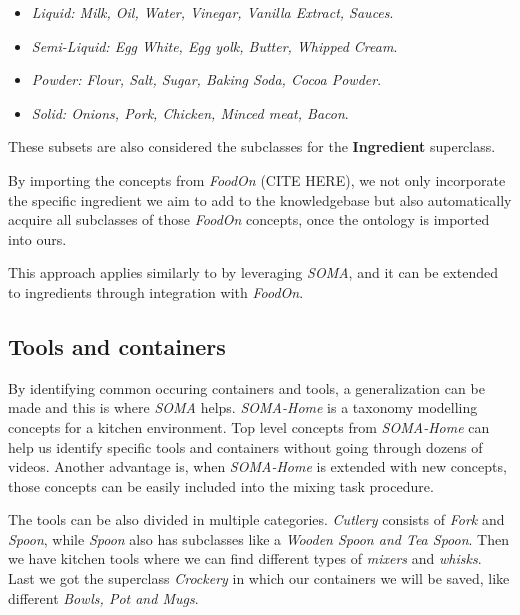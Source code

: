 \begin{itemize}
    \item \textit{Liquid: Milk, Oil, Water, Vinegar, Vanilla Extract, Sauces}.
    \item \textit{Semi-Liquid: Egg White, Egg yolk, Butter, Whipped Cream}.
    \item \textit{Powder: Flour, Salt, Sugar, Baking Soda, Cocoa Powder}.
    \item \textit{Solid: Onions, Pork, Chicken, Minced meat, Bacon}.
  \end{itemize}

These subsets are also considered the subclasses for the \textbf{Ingredient} superclass.

By importing the concepts from \textit{FoodOn} (CITE HERE), we not only incorporate the specific ingredient we aim to add to the knowledgebase but also automatically acquire all subclasses of those \textit{FoodOn} concepts, once the ontology is imported into ours. 

This approach applies similarly to  by leveraging \textit{SOMA}, and it can be extended to ingredients through integration with \textit{FoodOn}.


\subsection{Tools and containers}
\label{sec:toolsandcontainers}

By identifying common occuring containers and tools, 
a generalization can be made and this is where \textit{SOMA} helps. \textit{SOMA-Home} is a taxonomy modelling concepts for a kitchen environment.
Top level concepts from \textit{SOMA-Home} can help us identify specific tools and containers without going through dozens of videos. 
Another advantage is, when \textit{SOMA-Home} is extended with new concepts, those concepts can be easily included into the mixing task procedure. 

The tools can be also divided in multiple categories. \textit{Cutlery} consists of \textit{Fork} and \textit{Spoon}, while \textit{Spoon} also has subclasses like a \textit{Wooden Spoon and Tea Spoon}.
Then we have kitchen tools where we can find different types of \textit{mixers} and \textit{whisks}. Last we got the superclass \textit{Crockery} in which our containers we will be saved, like different \textit{Bowls, Pot and Mugs}.

